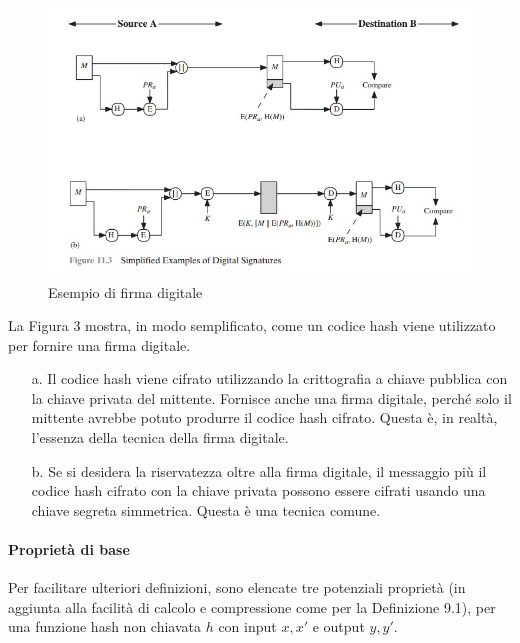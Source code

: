 \documentclass{article}
\theoremstyle{definition}
\begin{document}
\begin{figure}[H]
    \centering
    \includegraphics[width=\textwidth]{img/digital.jpg}
    \caption{Esempio di firma digitale}
    \label{fig:itm}
\end{figure}


La Figura 3 mostra, in modo semplificato, come un codice hash viene utilizzato per fornire una firma digitale.

\begin{itemize}
    \item[a.] Il codice hash viene cifrato utilizzando la crittografia a chiave pubblica con la chiave privata del mittente. Fornisce anche una firma digitale, perché solo il mittente avrebbe potuto produrre il codice hash cifrato. Questa è, in realtà, l'essenza della tecnica della firma digitale.
    \item[b.] Se si desidera la riservatezza oltre alla firma digitale, il messaggio più il codice hash cifrato con la chiave privata possono essere cifrati usando una chiave segreta simmetrica. Questa è una tecnica comune.
\end{itemize}

\paragraph{Proprietà di base}
Per facilitare ulteriori definizioni, sono elencate tre potenziali proprietà (in aggiunta alla facilità di calcolo e compressione come per la Definizione 9.1), per una funzione hash non chiavata \( h \) con input \( x, x' \) e output \( y, y' \).
\end{document}
